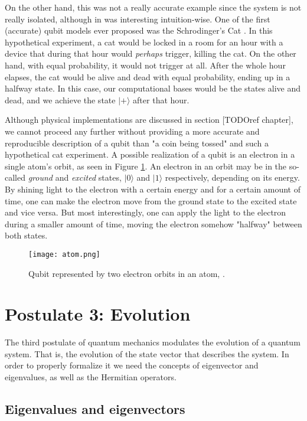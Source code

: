 On the other hand, this was not a really accurate example since the system is not really isolated, although in was interesting intuition-wise. One of the first (accurate) qubit models ever proposed was the Schrodinger's Cat \cite{Schrodinger1935} \cite{Schrodinger1935a}. In this hypothetical experiment, a cat would be locked in a room for an hour with a device that during that hour would \emph{perhaps} trigger, killing the cat. On the other hand, with equal probability, it would not trigger at all. After the whole hour elapses, the cat would be alive and dead with equal probability, ending up in a halfway state. In this case, our computational bases would be the states alive and dead, and we achieve the state $|+\rangle$ after that hour.

Although physical implementations are discussed in section [TODOref chapter], we cannot proceed any further without providing a more accurate and reproducible description of a qubit than "a coin being tossed" and such a hypothetical cat experiment. A possible realization of a qubit is an electron in a single atom's orbit, as seen in Figure \ref{fig 1.1}. An electron in an orbit may be in the so-called \emph{ground} and \emph{excited} states, $|0\rangle$ and $|1\rangle$ respectively, depending on its energy. By shining light to the electron with a certain energy and for a certain amount of time, one can make the electron move from the ground state to the excited state and vice versa. But most interestingly, one can apply the light to the electron during a smaller amount of time, moving the electron somehow "halfway" between both states.

\begin{figure}[h]
	\texttt{[image: atom.png]}
	\centering
	\caption{Qubit represented by two electron orbits in an atom, \cite{Nielsen2002}.}
	\label{fig 1.1}
\end{figure}


\section{Postulate 3: Evolution}


The third postulate of quantum mechanics modulates the evolution of a quantum system. That is, the evolution of the state vector that describes the system. In order to properly formalize it we need the concepts of eigenvector and eigenvalues, as well as the Hermitian operators.


\subsection{Eigenvalues and eigenvectors}


